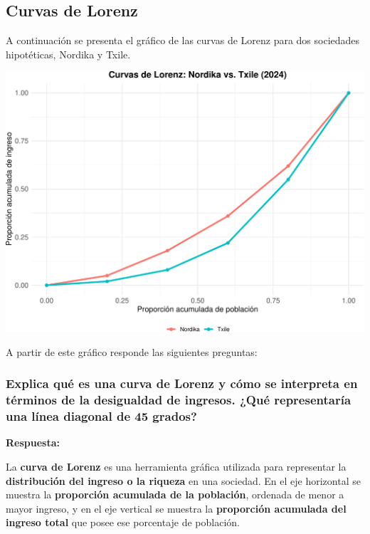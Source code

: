 \documentclass[
]{article}
\begin{document}
\subsection{Curvas de Lorenz}\label{curvas-de-lorenz}

A continuación se presenta el gráfico de las curvas de Lorenz para dos
sociedades hipotéticas, Nordika y Txile.

\begin{center}
\includegraphics{exam_answers_files/figure-pdf/lorenz-curves-1.pdf}
\end{center}

A partir de este gráfico responde las siguientes preguntas:

\subsubsection{Explica qué es una curva de Lorenz y cómo se interpreta
en términos de la desigualdad de ingresos. ¿Qué representaría una línea
diagonal de 45
grados?}\label{explica-quuxe9-es-una-curva-de-lorenz-y-cuxf3mo-se-interpreta-en-tuxe9rminos-de-la-desigualdad-de-ingresos.-quuxe9-representaruxeda-una-luxednea-diagonal-de-45-grados}

\textbf{Respuesta:}

La \textbf{curva de Lorenz} es una herramienta gráfica utilizada para
representar la \textbf{distribución del ingreso o la riqueza} en una
sociedad. En el eje horizontal se muestra la \textbf{proporción
acumulada de la población}, ordenada de menor a mayor ingreso, y en el
eje vertical se muestra la \textbf{proporción acumulada del ingreso
total} que posee ese porcentaje de población.
\end{document}
